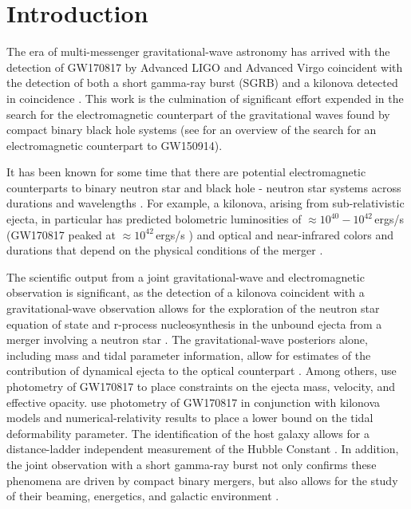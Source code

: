\documentclass[twocolumn]{aastex62}
\begin{document}

\section{Introduction}
\label{sec:Intro}

The era of multi-messenger gravitational-wave astronomy has arrived with the detection of GW170817 \citep{AbEA2017b} by Advanced LIGO \citep{aLIGO} and Advanced Virgo \citep{adVirgo} coincident with the detection of both a short gamma-ray burst (SGRB) \citep{AbEA2017c,AbEA2017d,AbEA2017e} and a kilonova detected in coincidence \citep{CoFo2017,SmCh2017,AbEA2017f}. 
This work is the culmination of significant effort expended in the search for the electromagnetic counterpart of the gravitational waves found by compact binary black hole systems \citep{AbEA2016a,AbEA2016g,AbEA2017} (see \cite{AbEA2016b} for an overview of the search for an electromagnetic counterpart to GW150914).

It has been known for some time that there are potential electromagnetic counterparts to binary neutron star and black hole - neutron star systems across durations and wavelengths \citep{Nakar2007,MeBe2012}. For example, a kilonova, arising from sub-relativistic ejecta, in particular has predicted bolometric luminosities of $\approx 10^{40}-10^{42}$\,ergs/s \citep{MeBa2015,BaKa2013} (GW170817 peaked at $\approx 10^{42}$\,ergs/s \citep{SmCh2017})
and optical and near-infrared colors and durations that depend on the physical conditions of the merger \citep{MeMa2010,KaBa2013,BaKa2013,TaHo2013,KaFe2015,BaKa2016,Me2017}.

The scientific output from a joint gravitational-wave and electromagnetic observation is significant, as the detection of a kilonova coincident with a gravitational-wave observation allows for the exploration of the neutron star equation of state \citep{BaBa2013} and r-process nucleosynthesis in the unbound ejecta from a merger involving a neutron star \citep{MeBa2015,JuBa2015,RoLi2017,WuFe2016}.
The gravitational-wave posteriors alone, including mass and tidal parameter information, allow for estimates of the contribution of dynamical ejecta to the optical counterpart \cite{AbEA2017g}.
Among others, \cite{SmCh2017} use photometry of GW170817 to place constraints on the ejecta mass, velocity, and effective opacity.
\cite{RaPe2018} use photometry of GW170817 in conjunction with kilonova models and numerical-relativity results to place a lower bound on the tidal deformability parameter. 
The identification of the host galaxy allows for a distance-ladder independent measurement of the Hubble Constant \citep{AbEA2017h}.
In addition, the joint observation with a short gamma-ray burst not only confirms these phenomena are driven by compact binary mergers, but also allows for the study of their beaming, energetics, and galactic environment \citep{MeBe2012}.
\end{document}
